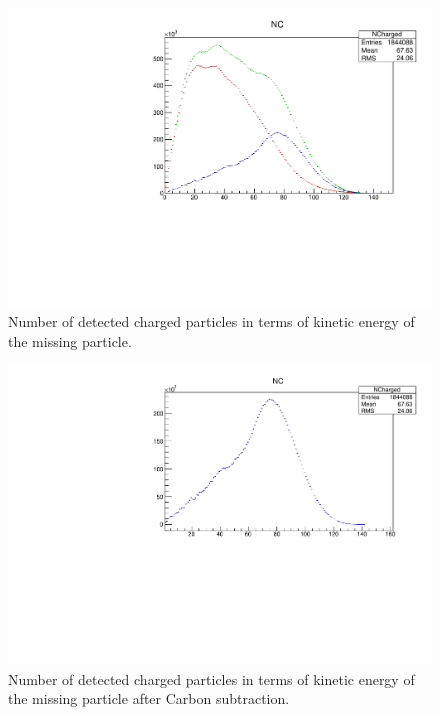 \documentclass[a4paper,12pt]{article}
\begin{document}
\begin{figure}
\includegraphics[width=\textwidth]{nc_b4.pdf}
\caption{Number of detected charged particles in terms of kinetic energy of the missing particle. }
\end{figure}

\begin{figure}
\includegraphics[width=\textwidth]{nc.pdf}
\caption{Number of detected charged particles in terms of kinetic energy of the missing particle after Carbon subtraction. }
\end{figure}
\end{document}
